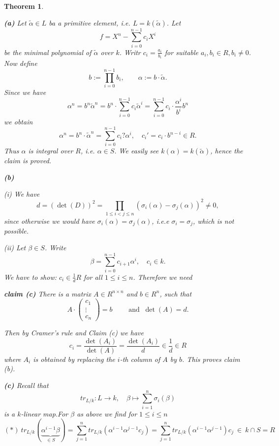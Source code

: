 \documentclass[11pt]{book}
\newtheorem{theorem}{Theorem}[section]
\theoremstyle{nonumberbreak}
\newenvironment{pr}[1][]{\ifthenelse{\equal{#1}{}}{\proof}{\proof[#1]}\rm}{\endproof}
\begin{document}
\begin{spacing}{1.3}
\begin{theorem}
\begin{pr}
\begin{compactenum}
\item[\textbf{(a)}] Let $\tilde{\alpha} \in L$ ba a primitive element, i.e. $L=k(\tilde{\alpha})$. Let 
$$f = X^n- \sum_{i=0}^{n-1} c_i X^{i}$$
be the minimal polynomial of $\tilde{\alpha}$ over $k$. Writr $c_i = \frac{a_i}{b_i}$ for suitable $a_i, b_i \in R, b_i \neq 0$. Now define
$$b:= \prod_{i=0}^{n-1} b_i, \qquad \alpha:= b \cdot \tilde{\alpha}.$$
Since we have
$$\alpha^n=b^n \tilde{\alpha}^n=b^n \cdot \sum_{i=0}^{n-1} c_i \tilde{\alpha}^{i} =\sum_{i=0}^{n-1} c_i \cdot \frac{\alpha^{i}}{b^{i}} b^n$$
we obtain
$$\alpha^n = b^n \cdot \tilde{\alpha}^n = \sum_{i=0}^{n-1}c_i? \alpha^{i}, \quad c_i'=c_i \cdot b^{n-i} \in R.$$
Thus $\alpha$ is integral over $R$, i.e. $\alpha \in S$. We easily see $k(\alpha)=k(\tilde{\alpha})$, hence the claim is proved.
\item[\textbf{(b)}] \begin{compactenum}
\item[(i)] We have
$$d= \left(\det(D)\right)^2 = \prod_{1 \leqslant i < j \leqslant n} \left(\sigma_i(\alpha)-\sigma_j(\alpha)\right)^2 \neq 0,$$
since otherwise we would have $\sigma_i(\alpha)=\sigma_j(\alpha)$, i.e.e $\sigma_i = \sigma_j$, which is not possible.
\item[(ii)] Let $\beta \in S$. Write 
$$\beta=\sum_{i=0}^{n-1} c_{i+1}\alpha^{i}, \quad c_i \in k.$$
We have to show: $c_i \in \frac{1}{d} R$ for all $1 \leqslant i \leqslant n$. Therefore we need
\begin{compactenum}
\item[\textbf{claim (c)}] There is a matrix $A \in R^{n \times n}$ and $b \in R^n$, such that
$$A \cdot \begin{pmatrix} c_1 \\ \vdots \\ c_n \end{pmatrix} = b \qquad \textrm{ and } \ \det(A)=d.$$
\end{compactenum} 
Then by Cramer's rule and Claim (c) we have
$$c_i= \frac{\det(A_i)}{\det(A)} = \frac{\det(A_i)}{d} \in \frac{1}{d} \in R$$
where $A_i$ is obtained by replacing the $i$-th column of $A$ by $b$. This proves claim (b).
\end{compactenum}
\item[\textbf{(c)}] Recall that 
$$tr_{L/k}: L \longrightarrow k, \quad \beta \mapsto \sum_{i=1}^n \sigma_i(\beta)$$
is a $k$-linear map.For $\beta$ as above we find for $1 \leqslant i \leqslant n$
$$(*) \ tr_{L/k}(\underbrace{\alpha^{i-1}\beta}_{\in S})= \sum_{j=1}^n tr_{L/k}(\alpha^{i-1} \alpha^{j-1} c_j)=\sum_{j=1}^n tr_{L/k}(\alpha^{i-1}\alpha^{j-1})c_j \ \in \ k \cap S = R$$

\end{compactenum}
\end{pr}
\end{theorem}
\end{spacing}
\end{document}
